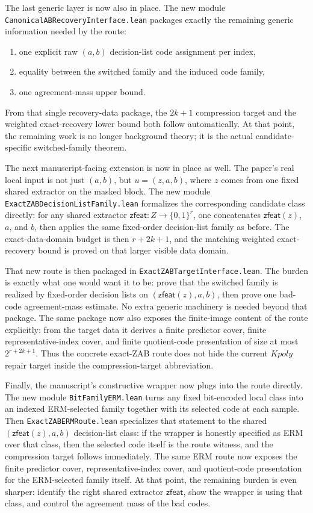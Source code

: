 \documentclass[11pt]{article}
\theoremstyle{remark}
\begin{document}
The last generic layer is now also in place.  The new module
\texttt{CanonicalABRecoveryInterface.lean} packages exactly the remaining
generic information needed by the route:
\begin{enumerate}[leftmargin=1.5em]
  \item one explicit raw \((a,b)\) decision-list code assignment per index,
  \item equality between the switched family and the induced code family,
  \item one agreement-mass upper bound.
\end{enumerate}
From that single recovery-data package, the \(2k+1\) compression target and the
weighted exact-recovery lower bound both follow automatically.  At that point,
the remaining work is no longer background theory; it is the actual
candidate-specific switched-family theorem.

The next manuscript-facing extension is now in place as well.  The paper's real
local input is not just \((a,b)\), but \(u=(z,a,b)\), where \(z\) comes from one
fixed shared extractor on the masked block.  The new module
\texttt{ExactZABDecisionListFamily.lean} formalizes the corresponding candidate
class directly: for any shared extractor \(\mathsf{zfeat}: Z \to \{0,1\}^r\), one
concatenates \(\mathsf{zfeat}(z)\), \(a\), and \(b\), then applies the same
fixed-order decision-list family as before.  The exact-data-domain budget is then
\(r+2k+1\), and the matching weighted exact-recovery bound is proved on that
larger visible data domain.

That new route is then packaged in \texttt{ExactZABTargetInterface.lean}.  The
burden is exactly what one would want it to be: prove that the switched family
is realized by fixed-order decision lists on \((\mathsf{zfeat}(z),a,b)\), then
prove one bad-code agreement-mass estimate.  No extra generic machinery is
needed beyond that package.  The same package now also exposes the finite-image
content of the route explicitly: from the target data it derives a finite
predictor cover, finite representative-index cover, and finite quotient-code
presentation of size at most \(2^{r+2k+1}\).  Thus the concrete exact-ZAB route
does not hide the current \(Kpoly\) repair target inside the compression-target
abbreviation.

Finally, the manuscript's constructive wrapper now plugs into the route
directly.  The new module \texttt{BitFamilyERM.lean} turns any fixed bit-encoded
local class into an indexed ERM-selected family together with its selected code
at each sample.  Then \texttt{ExactZABERMRoute.lean} specializes that statement
to the shared \((\mathsf{zfeat}(z),a,b)\) decision-list class: if the wrapper is
honestly specified as ERM over that class, then the selected code itself is the
route witness, and the compression target follows immediately.  The same ERM
route now exposes the finite predictor cover, representative-index cover, and
quotient-code presentation for the ERM-selected family itself.  At that point,
the remaining burden is even sharper: identify the right shared extractor
\(\mathsf{zfeat}\), show the wrapper is using that class, and control the
agreement mass of the bad codes.
\end{document}
